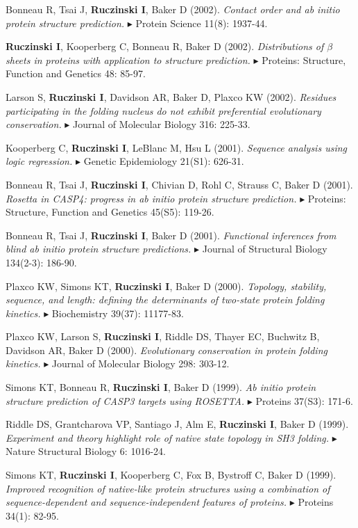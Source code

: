 \documentclass[10pt]{article}
\newcommand{\mine}{
  \addtocounter{enumi}{1}
\item[\fcolorbox{white}{grey}{\color{white} \tiny \arabic{enumi}}]
}
\newcommand{\dg}[1]{{\color{black} $\blacktriangleright$ {#1}}}
\begin{document}
\item 
Bonneau R, Tsai J, {\bf Ruczinski I}, Baker D (2002). 
{\it Contact order and ab initio protein structure prediction.}
\dg{Protein Science} 11(8): 1937-44.
\mine
{\bf Ruczinski I}, Kooperberg C, Bonneau R, Baker D (2002). 
{\it Distributions of $\beta$ sheets in proteins with application to structure prediction.}
\dg{Proteins: Structure, Function and Genetics} 48: 85-97. 
\item 
Larson S, {\bf Ruczinski I}, Davidson AR, Baker D, Plaxco KW (2002). 
{\it Residues participating in the folding nucleus do not exhibit preferential evolutionary conservation.}
\dg{Journal of Molecular Biology} 316: 225-33.
\item 
Kooperberg C, {\bf Ruczinski I}, LeBlanc M, Hsu L (2001). 
{\it Sequence analysis using logic regression.}
\dg{Genetic Epidemiology} 21(S1): 626-31.
\item 
Bonneau R, Tsai J, {\bf Ruczinski I}, Chivian D, Rohl C, Strauss C, Baker D (2001).  
{\it Rosetta in CASP4: progress in ab initio protein structure prediction.} 
\dg{Proteins: Structure, Function and Genetics} 45(S5): 119-26.
\item 
Bonneau R, Tsai J, {\bf Ruczinski I}, Baker D (2001). 
{\it Functional inferences from blind ab initio protein structure predictions.} 
\dg{Journal of Structural Biology} 134(2-3): 186-90.
\item 
Plaxco KW, Simons KT, {\bf Ruczinski I}, Baker D (2000). 
{\it Topology, stability, sequence, and length: defining the determinants of two-state protein folding kinetics.} 
\dg{Biochemistry} 39(37): 11177-83.
\item 
Plaxco KW, Larson S, {\bf Ruczinski I}, Riddle DS, Thayer EC, Buchwitz B, Davidson AR, Baker D (2000). 
{\it Evolutionary conservation in protein folding kinetics.}
\dg{Journal of Molecular Biology} 298: 303-12.
\item 
Simons KT, Bonneau R, {\bf Ruczinski I}, Baker D (1999). 
{\it Ab initio protein structure prediction of CASP3 targets using ROSETTA.}
\dg{Proteins} 37(S3): 171-6.
\item 
Riddle DS, Grantcharova VP, Santiago J, Alm E, {\bf Ruczinski I}, Baker D (1999).  
{\it Experiment and theory highlight role of native state topology in SH3 folding.} 
\dg{Nature Structural Biology} 6: 1016-24.
\item
Simons KT, {\bf Ruczinski I}, Kooperberg C, Fox B, Bystroff C, Baker D (1999).  
{\it Improved recognition of native-like protein structures using a combination of sequence-dependent and sequence-independent features of proteins.}  
\dg{Proteins} 34(1): 82-95.
\end{document}
